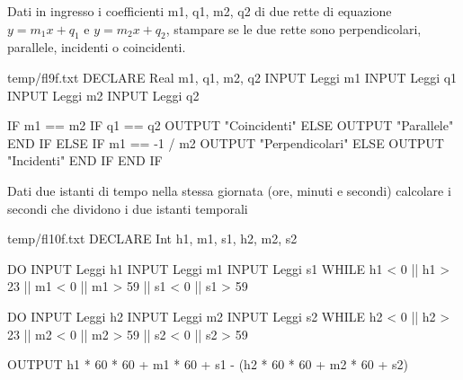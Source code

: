\documentclass[11pt,fleqn]{book}
\begin{document}
\begin{esercizio}[1]
    Dati in ingresso i coefficienti m1, q1, m2, q2 di due rette di equazione $y = m_1x + q_1$ e $y = m_2x + q_2$, stampare se le due rette sono perpendicolari, parallele, incidenti o coincidenti.
    \ifsoluzioni
        \solution
        
        \begin{filecontents*}{temp/fl9f.txt}
        DECLARE Real m1, q1, m2, q2
        INPUT Leggi m1
        INPUT Leggi q1
        INPUT Leggi m2
        INPUT Leggi q2

        IF m1 == m2
            IF q1 == q2
                OUTPUT "Coincidenti"
            ELSE
                OUTPUT "Parallele"
            END IF
        ELSE
            IF m1 == -1 / m2
                OUTPUT "Perpendicolari"
            ELSE
                OUTPUT "Incidenti"
            END IF
        END IF
        \end{filecontents*}

        \immediate{}
        
        \newpage

        \immediate{}
        
        \newpage
    \fi
\end{esercizio}

\begin{esercizio}[1]
    Dati due istanti di tempo nella stessa giornata (ore, minuti e secondi) calcolare i secondi che dividono i due istanti temporali
    \ifsoluzioni
        \solution
        
        \begin{filecontents*}{temp/fl10f.txt}
        DECLARE Int h1, m1, s1, h2, m2, s2

        DO
            INPUT Leggi h1
            INPUT Leggi m1
            INPUT Leggi s1
        WHILE h1 < 0 || h1 > 23 || m1 < 0 || m1 > 59 || s1 < 0 || s1 > 59

        DO
            INPUT Leggi h2
            INPUT Leggi m2
            INPUT Leggi s2
        WHILE h2 < 0 || h2 > 23 || m2 < 0 || m2 > 59 || s2 < 0 || s2 > 59


        OUTPUT h1 * 60 * 60 + m1 * 60 + s1  - (h2 * 60 * 60 + m2 * 60 + s2)
        \end{filecontents*}

        \immediate{}
        
        \newpage

        \immediate{}
        
        \newpage
    \fi
\end{esercizio}
\end{document}
